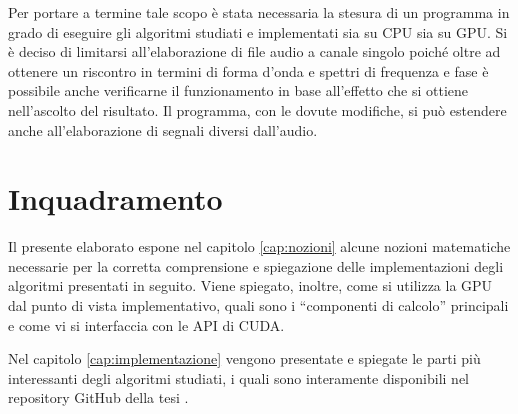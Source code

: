Per portare a termine tale scopo è stata necessaria la stesura di un programma in grado di eseguire gli algoritmi studiati e implementati sia su CPU sia su GPU. Si è deciso di limitarsi all'elaborazione di file audio a canale singolo poiché oltre ad ottenere un riscontro in termini di forma d'onda e spettri di frequenza e fase è possibile anche verificarne il funzionamento in base all'effetto che si ottiene nell'ascolto del risultato. Il programma, con le dovute modifiche, si può estendere anche all'elaborazione di segnali diversi dall'audio.

\section{Inquadramento}
Il presente elaborato espone nel capitolo \ref{cap:nozioni} alcune nozioni matematiche necessarie per la corretta comprensione e spiegazione delle implementazioni degli algoritmi presentati in seguito. Viene spiegato, inoltre, come si utilizza la GPU dal punto di vista implementativo, quali sono i ``componenti di calcolo'' principali e come vi si interfaccia con le API di CUDA.

Nel capitolo \ref{cap:implementazione} vengono presentate e spiegate le parti più interessanti degli algoritmi studiati, i quali sono interamente disponibili nel repository GitHub della tesi \cite{repo}.